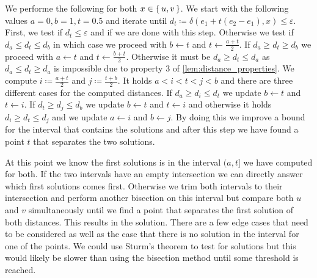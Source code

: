 We performe the following for both \(x \in \set{u, v}\). We start with the following values \(a = 0, b = 1, t = 0.5\) and iterate  until \(d_t \coloneq \delta(e_1 + t(e_2 - e_1), x) \leq \varepsilon\). 
First, we test if \(d_t \leq \varepsilon\) and if we are done with this step. Otherwise we test if \(d_a \leq d_t \leq d_b\) in which case we proceed with \(b \gets t\) and \(t \gets \frac{a + t}2\). If \(d_a \geq d_t \geq d_b\) we proceed with \(a \gets t\) and \(t \gets \frac{b + t}2\). Otherwise it must be \(d_a \geq d_t \leq d_a\) as \(d_a \leq d_t \geq d_a\) is impossible due to property 3 of \cref{lem:distance_properties}.
We compute \(i \coloneq \frac{a + t}2\) and \(j \coloneq \frac{t + b}2\). It holds \(a < i < t < j < b\) and there are three different cases for the computed distances. If \(d_a \geq d_i \leq d_t\) we update \(b \gets t\) and \(t \gets i\). If \(d_t \geq d_j \leq d_b\) we update \(b \gets t\) and \(t \gets i\) and otherwise it holds \(d_i \geq d_t \leq d_j\) and we update \(a \gets i\) and \(b \gets j\). By doing this we improve a bound for the interval that contains the solutions and after this step we have found a point \(t\) that separates the two solutions. 

At this point we know the first solutions is in the interval \((a, t]\) we have computed for both. If the two intervals have an empty intersection we can directly answer which first solutions comes first. Otherwise we trim both intervals to their intersection and perform another bisection on this interval but compare both \(u\) and \(v\) simultaneously until we find a point that separates the first solution of both distances. This results in the solution. There are a few edge cases that need to be considered as well as the case that there is no solution in the interval for one of the points. We could use Sturm's theorem to test for solutions but this would likely be slower than using the bisection method until some threshold is reached.

